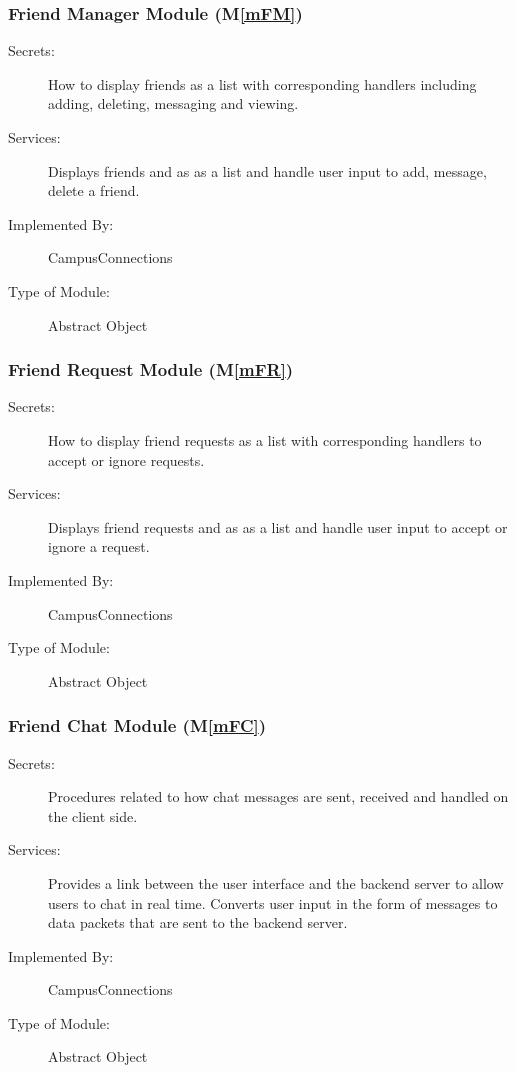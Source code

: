 \documentclass[12pt, titlepage]{article}
\newcommand{\mref}[1]{M\ref{#1}}
\begin{document}
\subsubsection{Friend Manager Module (\mref{mFM})}
\begin{description}
\item[Secrets:]How to display friends as a list with corresponding handlers including adding, deleting, messaging and viewing.
\item[Services:]Displays friends and as as a list and handle user input to add, message, delete a friend.
\item[Implemented By:] CampusConnections
\item[Type of Module:] Abstract Object
\end{description}

\subsubsection{Friend Request Module (\mref{mFR})}
\begin{description}
\item[Secrets:]How to display friend requests as a list with corresponding handlers to accept or ignore requests.
\item[Services:]Displays friend requests and as as a list and handle user input to accept or ignore a request.
\item[Implemented By:] CampusConnections
\item[Type of Module:] Abstract Object
\end{description}

\subsubsection{Friend Chat Module (\mref{mFC})}
\begin{description}
\item[Secrets:]Procedures related to how chat messages are sent, received and handled on the client side.
\item[Services:]Provides a link between the user interface and the backend server to allow users to chat in real time. Converts user input in the form of messages to data packets that are sent to the backend server.
\item[Implemented By:] CampusConnections
\item[Type of Module:] Abstract Object
\end{description}
\end{document}

